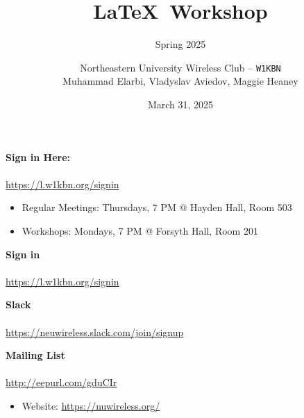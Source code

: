\documentclass[x11names]{beamer} %
\title{\LaTeX\ Workshop}
\subtitle{Spring 2025}
\author{
  Northeastern University Wireless Club – \texttt{W1KBN} \\
  {\small Muhammad Elarbi, Vladyslav Aviedov, Maggie Heaney}
}
\date{March 31, 2025}
\begin{document}
\begin{frame}
  \titlepage
  \vspace{-1cm}
  \begin{center}
    \textbf{Sign in Here:} \\
     \\
    {\small \url{https://l.w1kbn.org/signin}}
  \end{center}
\end{frame}

\begin{frame}
  \begin{tcolorbox}[colframe=black, colback=blue!10, title=About, center title]
    \begin{itemize}
      \item Regular Meetings: Thursdays, 7 PM @ Hayden Hall, Room 503
      \item Workshops: Mondays, 7 PM @ Forsyth Hall, Room 201
    \end{itemize}        
  \end{tcolorbox}

  \begin{tcolorbox}[colframe=black, colback=blue!10, title=QR Codes \& Links, center title]
    \begin{minipage}{0.32\textwidth}
      \centering
      \textbf{Sign in} \\
       \\
      \tiny \url{https://l.w1kbn.org/signin}
    \end{minipage}
    \begin{minipage}{0.32\textwidth}
      \centering
      \textbf{Slack} \\
       \\
      \tiny \url{https://neuwireless.slack.com/join/signup}
    \end{minipage}
    \begin{minipage}{0.32\textwidth}
      \centering
      \textbf{Mailing List} \\
       \\
      \tiny \url{http://eepurl.com/gduCIr}
    \end{minipage}
    \begin{itemize}
      \item Website: \url{https://nuwireless.org/}
    \end{itemize}
  \end{tcolorbox}
\end{frame}
\end{document}
